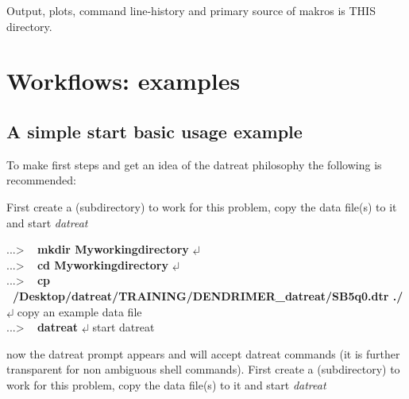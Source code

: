 \documentclass[11pt,fleqn]{book} %
\newcommand{\return}{$\carriagereturn$} %
\newcommand{\sysprompt}{{\color{green}...\textgreater} ~ }
\newcommand{\enter}[1]{{\color{red} \bf #1}}
\newcommand{\desc}[1]{\hskip 0.5cm {\color{descgray} #1}}
\newcommand{\expl}[1]{\hskip 0.5cm {\color{explgray} #1}}
\begin{document}
Output, plots, command line-history and primary source of makros is THIS directory.


\chapter{Workflows: examples}
\label{cha:workex}

\section{A simple start \desc{basic usage example}}

To make first steps and get an idea of the datreat philosophy the following is recommended:

First create a (subdirectory) to work for this problem, copy the data file(s) to it and start \emph{datreat}
\begin{corollary}
\sysprompt {\bf mkdir Myworkingdirectory} \return \\ 
\sysprompt {\bf cd Myworkingdirectory} \return  \\
\sysprompt {\bf cp ~/Desktop/datreat/TRAINING/DENDRIMER\_datreat/SB5q0.dtr ./}  \return \expl{copy an example data file}\\
\sysprompt {\bf datreat} \return \expl{start datreat} \\
\end{corollary}

now the datreat prompt appears and will accept datreat commands (it is further transparent for non ambiguous
shell commands).
First create a (subdirectory) to work for this problem, copy the data file(s) to it and start \emph{datreat}
\end{document}
